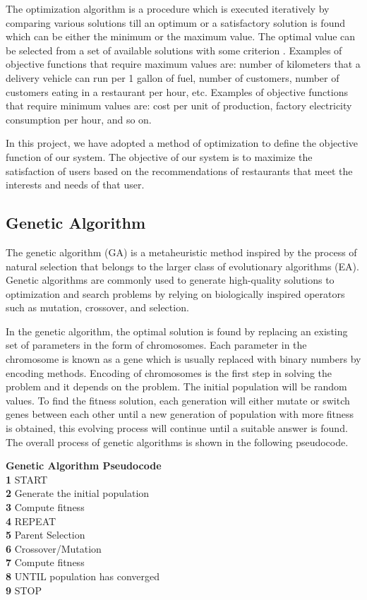 \documentclass[12pt,oneside,openright,a4paper]{cpe-english-project}
\begin{document}
The optimization algorithm is a procedure which is executed iteratively by comparing various solutions till an optimum or a satisfactory solution is found \cite{AlgorithmsforDiscreteOptimization} which can be either the minimum or the maximum value. The optimal value can be selected from a set of available solutions with some criterion \cite{Mathematicaloptimization}. Examples of objective functions that require maximum values ​​are: number of kilometers that a delivery vehicle can run per 1 gallon of fuel, number of customers, number of customers eating in a restaurant per hour, etc. Examples of objective functions that require minimum values ​​are: cost per unit of production, factory electricity consumption per hour, and so on.

In this project, we have adopted a method of optimization to define the objective function of our system. The objective of our system is to maximize the satisfaction of users based on the recommendations of restaurants that meet the interests and needs of that user.

\subsection{Genetic Algorithm}

The genetic algorithm (GA) is a metaheuristic method inspired by the process of natural selection that belongs to the larger class of evolutionary algorithms (EA). Genetic algorithms are commonly used to generate high-quality solutions to optimization and search problems by relying on biologically inspired operators such as mutation, crossover, and selection. \cite{Geneticalgorithm}

In the genetic algorithm, the optimal solution is found by replacing an existing set of parameters in the form of chromosomes. Each parameter in the chromosome is known as a gene which is usually replaced with binary numbers by encoding methods. Encoding of chromosomes is the first step in solving the problem and it depends on the problem. The initial population will be random values. To find the fitness solution, each generation will either mutate or switch genes between each other until a new generation of population with more fitness is obtained, this evolving process will continue until a suitable answer is found. The overall process of genetic algorithms is shown in the following pseudocode.


\textbf{Genetic Algorithm Pseudocode}\cite{IntroductiontoGeneticAlgorithmsIncludingExampleCode}\\
\textbf{1} START\\
\textbf{2} Generate the initial population\\
\textbf{3} Compute fitness\\
\textbf{4} REPEAT\\
\textbf{5} \quad Parent Selection\\
\textbf{6} \quad Crossover/Mutation\\
\textbf{7} \quad Compute fitness\\
\textbf{8} UNTIL population has converged\\
\textbf{9} STOP\\
\end{document}

